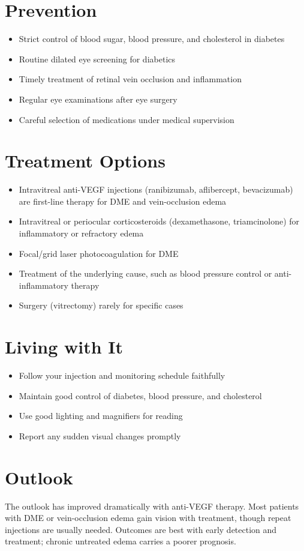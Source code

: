 \section{Prevention}
\begin{itemize}[noitemsep]
  \item Strict control of blood sugar, blood pressure, and cholesterol in diabetes
  \item Routine dilated eye screening for diabetics
  \item Timely treatment of retinal vein occlusion and inflammation
  \item Regular eye examinations after eye surgery
  \item Careful selection of medications under medical supervision
\end{itemize}
\section{Treatment Options}
\begin{itemize}[noitemsep]
  \item Intravitreal anti-VEGF injections (ranibizumab, aflibercept, bevacizumab) are first-line therapy for DME and vein-occlusion edema
  \item Intravitreal or periocular corticosteroids (dexamethasone, triamcinolone) for inflammatory or refractory edema
  \item Focal/grid laser photocoagulation for DME
  \item Treatment of the underlying cause, such as blood pressure control or anti-inflammatory therapy
  \item Surgery (vitrectomy) rarely for specific cases
\end{itemize}
\section{Living with It}
\begin{itemize}[noitemsep]
  \item Follow your injection and monitoring schedule faithfully
  \item Maintain good control of diabetes, blood pressure, and cholesterol
  \item Use good lighting and magnifiers for reading
  \item Report any sudden visual changes promptly
\end{itemize}
\section{Outlook}
The outlook has improved dramatically with anti-VEGF therapy. Most patients with DME or vein-occlusion edema gain vision with treatment, though repeat injections are usually needed. Outcomes are best with early detection and treatment; chronic untreated edema carries a poorer prognosis.
